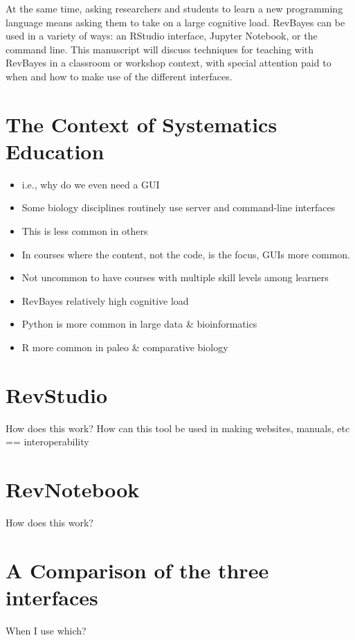 \documentclass{article}
\begin{document}
At the same time, asking researchers and students to learn a new programming language means asking them to take on a large cognitive load.
RevBayes can be used in a variety of ways: an RStudio interface, Jupyter Notebook, or the command line.
This manuscript will discuss techniques for teaching with RevBayes in a classroom or workshop context, with special attention paid to when and how to make use of the different interfaces.




\section{The Context of Systematics Education}

\begin{itemize}
    \item i.e., why do we even need a GUI
    \item Some biology disciplines routinely use server and command-line interfaces
    \item This is less common in others
    \item In courses where the content, not the code, is the focus, GUIs more common.
    \item Not uncommon to have courses with multiple skill levels among learners
    \item RevBayes relatively high cognitive load
    \item Python is more common in large data \& bioinformatics
    \item R more common in paleo \& comparative biology
\end{itemize}

\section{RevStudio}

How does this work?  
How can this tool be used in making websites, manuals, etc == interoperability

\section{RevNotebook}

How does this work? 

\section{A Comparison of the three interfaces}

When I use which?
\end{document}
